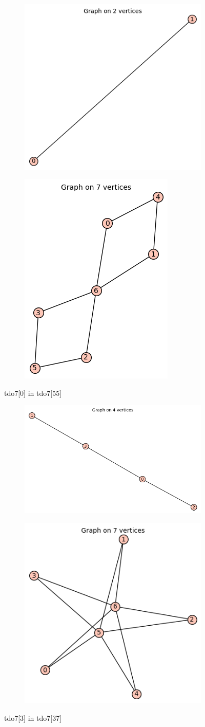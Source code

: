 \documentclass[12pt, a4paper]{article}
\begin{document}
\begin{center}
\begin{figure}[!htb]
\centering
\begin{subfigure}{0.5\textwidth}
  \centering
  \includegraphics[width=0.4\linewidth]{tdo7[0]}
\end{subfigure}%
\begin{subfigure}{0.5\textwidth}
  \centering
  \includegraphics[width=0.35\linewidth]{tdo7[55]}
\end{subfigure}
\caption{tdo7[0] in tdo7[55]}
\label{fig:test}
\end{figure}

\begin{figure}[!htb]
\centering
\begin{subfigure}{0.5\textwidth}
  \centering
  \includegraphics[width=0.45\linewidth]{tdo7[3]}
\end{subfigure}%
\begin{subfigure}{0.5\textwidth}
  \centering
  \includegraphics[width=0.45\linewidth]{tdo7[37]}
\end{subfigure}
\caption{tdo7[3] in tdo7[37]}
\label{fig:test}
\end{figure}
\clearpage


\end{center}
\end{document}
